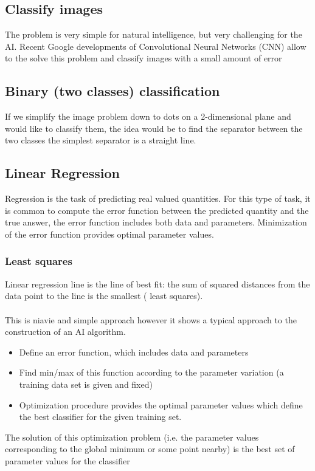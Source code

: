 \subsection{Classify images}
The problem is very simple for natural intelligence, but very challenging for the AI. Recent Google developments of Convolutional Neural Networks (CNN) allow to the solve this problem and classify images with a small amount of error
\subsection{Binary (two classes) classification}
If we simplify the image problem down to dots on a 2-dimensional plane and would like to classify them, the idea would be to find the separator between the two classes the simplest separator is a straight line. 
\subsection{Linear Regression}
Regression is the task of predicting real valued quantities. For this type of task, it is common to compute the error function between the predicted quantity and  the true answer, the error function includes both data and parameters. Minimization of the error function provides optimal parameter values.
\subsubsection{Least squares}
Linear regression line is the line of best fit: the sum of squared distances from the data point to the line is the smallest ( least squares).
\\\\
This is niavie and simple approach however it shows a typical approach to the construction of an AI algorithm.
\begin{itemize}
    \item Define an error function, which includes data and parameters
    \item Find min/max of this function according to the parameter variation (a training data set is given and fixed)
    \item Optimization procedure provides the optimal parameter values which define the best classifier for the given training set.
\end{itemize}
The solution of this optimization problem (i.e. the parameter values corresponding to the global minimum or some point nearby) is the best set of parameter values for the classifier
